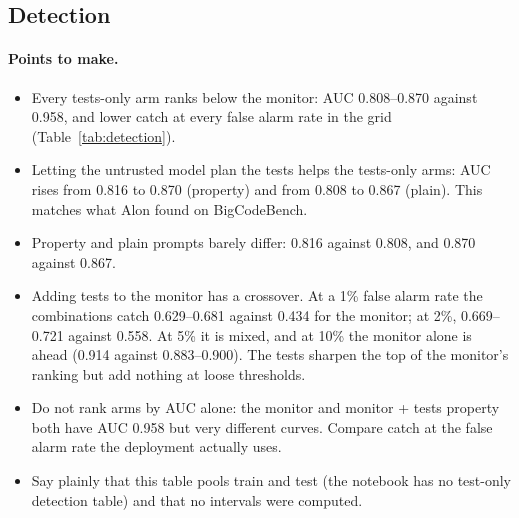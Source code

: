 \subsection{Detection}
\label{sec:detection}

\paragraph{Points to make.}
\begin{itemize}
  \item Every tests-only arm ranks below the monitor: AUC 0.808--0.870 against
        0.958, and lower catch at every false alarm rate in the grid
        (Table~\ref{tab:detection}).
  \item Letting the untrusted model plan the tests helps the tests-only arms:
        AUC rises from 0.816 to 0.870 (property) and from 0.808 to 0.867
        (plain). This matches what Alon found on BigCodeBench.
  \item Property and plain prompts barely differ: 0.816 against 0.808, and
        0.870 against 0.867.
  \item Adding tests to the monitor has a crossover. At a 1\% false alarm rate
        the combinations catch 0.629--0.681 against 0.434 for the monitor; at
        2\%, 0.669--0.721 against 0.558. At 5\% it is mixed, and at 10\% the
        monitor alone is ahead (0.914 against 0.883--0.900). The tests sharpen
        the top of the monitor's ranking but add nothing at loose thresholds.
  \item Do not rank arms by AUC alone: the monitor and monitor + tests property
        both have AUC 0.958 but very different curves. Compare catch at the
        false alarm rate the deployment actually uses.
  \item Say plainly that this table pools train and test (the notebook has no
        test-only detection table) and that no intervals were computed.
\end{itemize}

